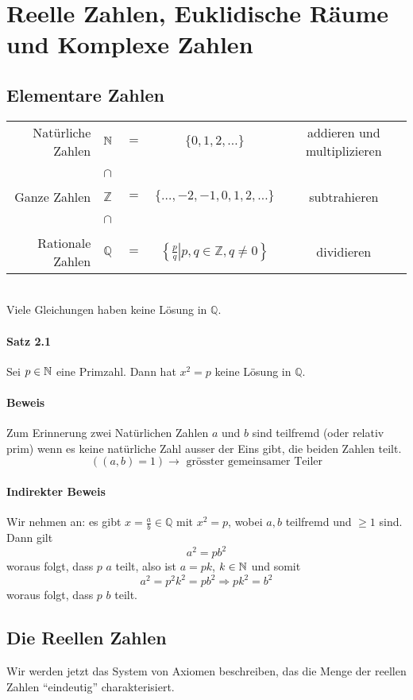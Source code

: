 \chapter{Reelle Zahlen, Euklidische Räume und Komplexe Zahlen}
\section{Elementare Zahlen}
\begin{tabular}{r l c c c}
Natürliche Zahlen & $\mathbb{N}$&$=$& $\{0,1,2,\dots\}$& addieren und multiplizieren\\
~& $\cap$ &~&~&~\\
Ganze Zahlen & $\mathbb{Z}$&$=$& $\{\dots ,-2,-1,0,1,2,\dots\}$& subtrahieren\\
~& $\cap$ &~&~&~\\
Rationale Zahlen & $\mathbb{Q}$&$=$& $\left\{ {\left. {\frac{p}{q}} \right|p,q \in \mathbb{Z},q\not  = 0} \right\}$& dividieren\\
\end{tabular}
\\
Viele Gleichungen haben keine Lösung in $\mathbb{Q}$.
\subsubsection*{Satz 2.1}
Sei $p\in\mathbb{N}$ eine Primzahl. Dann hat $x^2=p$ keine Lösung in $\mathbb{Q}$.
\subsubsection*{Beweis}

Zum Erinnerung zwei Natürlichen Zahlen $a$ und $b$ sind teilfremd (oder relativ prim) wenn es keine natürliche Zahl ausser der Eins gibt, die beiden Zahlen teilt. \[\left( (a,b)=1\right)\to\text{ grösster gemeinsamer Teiler}\]

\subsubsection*{Indirekter Beweis}
Wir nehmen an: es gibt $x=\frac{a}{b}\in \mathbb{Q}$ mit $x^2 =p$, wobei $a,b$ teilfremd und $\geq 1$ sind. Dann gilt \[a^2=pb^2\] woraus folgt, dass $p$ $a$ teilt, also ist $a=pk$, $k\in\mathbb{N}$ und somit \[a^2=p^2k^2=pb^2\Rightarrow pk^2=b^2\] woraus folgt, dass $p$ $b$ teilt.

\section{Die Reellen Zahlen}
Wir werden jetzt das System von Axiomen beschreiben, das die Menge der reellen Zahlen ``eindeutig'' charakterisiert. \\

